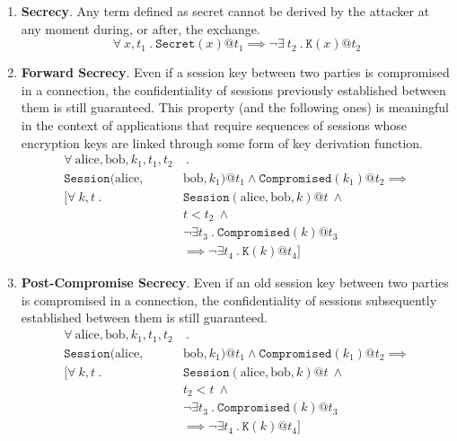 \begin{enumerate}
    \item \textbf{Secrecy}. Any term defined as secret cannot be derived by the attacker at any moment during, or after, the exchange.
        \begin{equation}
            \forall \ x,t_1 \ . \ \mathtt{Secret}(x) @ t_1 \implies \neg \exists \ t_2 \ . \ \mathtt{K}(x) @ t_2
        \end{equation}
    \item \textbf{Forward Secrecy}. Even if a session key between two parties is compromised in a connection, the confidentiality of sessions previously established between them is still guaranteed. This property (and the following ones) is meaningful in the context of applications that require sequences of sessions whose encryption keys are linked through some form of key derivation function.
        \begin{align*}
            \forall \ \text{alice}, \text{bob},k_1, t_1, t_2 &\ . \\
            \mathtt{Session}(\text{alice},&\text{bob},k_1) @ t_1 \land \mathtt{Compromised}(k_1)@t_2 \implies \\
            [\forall \ k, t \ . \ &\mathtt{Session}(\text{alice}, \text{bob}, k)@t \  \land \\
            &t<t_2 \ \land \\
            &\neg \exists t_3\ . \ \mathtt{Compromised}(k) @ t_3 \\
            &\implies \neg \exists t_4 \ . \ \mathtt{K}(k)@t_4]
        \end{align*}
    \item \textbf{Post-Compromise Secrecy}. Even if an old session key between two parties is compromised in a connection, the confidentiality of sessions subsequently established between them is still guaranteed.
        \begin{align*}
            \forall \ \text{alice}, \text{bob},k_1, t_1, t_2 &\ . \\
            \mathtt{Session}(\text{alice},&\text{bob},k_1) @ t_1 \land \mathtt{Compromised}(k_1)@t_2 \implies \\
            [\forall \ k, t \ . \ &\mathtt{Session}(\text{alice}, \text{bob}, k)@t \  \land \\
            &t_2<t \ \land \\
            &\neg \exists t_3\ . \ \mathtt{Compromised}(k) @ t_3 \\
            &\implies \neg \exists t_4 \ . \ \mathtt{K}(k)@t_4]

\end{align*}
\end{enumerate}
